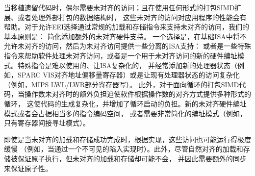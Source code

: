 \begin{commentary}
当移植遗留代码时，偶尔需要未对齐的访问；且在使用任何形式的打包SIMD扩展、或者处理外部打包的数据结构时，
这些未对齐的访问对应用程序的性能会有帮助。对于允许EEI选择通过常规的加载和存储指令来支持未对齐的访问，我们的基本原则是：
简化添加额外的未对齐硬件支持。
一个选择是，在基础ISA中将不允许未对齐的访问，然后为未对齐访问提供一些分离的ISA支持：
或者是一些特殊指令来帮助软件处理未对齐访问，或者是一个用于未对齐访问的新的硬件编址模式。特殊指令是难以使用的、让ISA复杂化的，
并经常添加新的处理器状态（例如，SPARC VIS对齐地址偏移量寄存器）或是让现有处理器状态的访问复杂化
（例如，MIPS LWL/LWR部分寄存器写）。
此外，对于面向循环的打包SIMD代码，当操作数未对齐时的额外负担迫使软件根据操作数的对齐方式提供多种形式的循环，
这使代码的生成复杂化，并增加了循环启动的负担。新的未对齐硬件编址模式或者会占据相当多的指令编码空间，
或者需要非常简化的编址模式（例如，只有寄存器间接寻址模式）。
\end{commentary}

即使是当未对齐的加载和存储成功完成时，根据实现，这些访问也可能运行得极度缓慢
（例如，当通过一个不可见的陷入实现时）。此外，尽管自然对齐的加载和存储被保证原子执行，但未对齐的加载和存储却可能不会，
并因此需要额外的同步来保证原子性。

